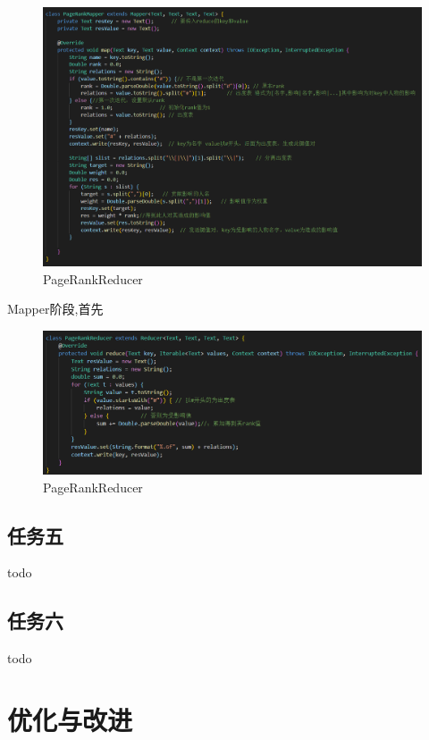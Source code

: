 \documentclass[a4paper,UTF8]{article}
\numberwithin{equation}{section}
\begin{document}
\begin{figure}[H]
    \centering

    \includegraphics[width = 15cm]{PageRankMapper.png}

    \caption{PageRankReducer}
\end{figure}
Mapper阶段,首先
\begin{figure}[H]
    \centering

    \includegraphics[width = 15cm]{PageRankReducer.png}

    \caption{PageRankReducer}
\end{figure}


\subsection{任务五}
todo

\subsection{任务六}
todo

\section{优化与改进}
\end{document}
